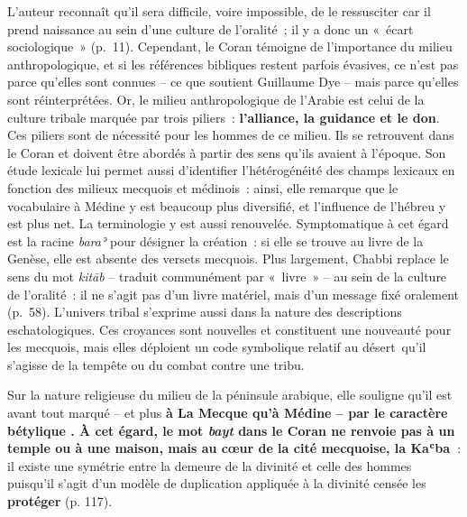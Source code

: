 L'auteur reconnaît qu'il sera difficile, voire impossible, de le
ressusciter car il prend naissance au sein d'une culture de l'oralité~;
il y a donc un «~écart sociologique~» (p.~11). Cependant, le Coran
témoigne de l'importance du milieu anthropologique, et si les références
bibliques restent parfois évasives, ce n'est pas parce qu'elles sont
connues -- ce que soutient Guillaume Dye -- mais parce qu'elles sont
réinterprétées. Or, le milieu anthropologique de l'Arabie est celui de
la culture tribale marquée par trois piliers~: \textbf{l'alliance, la
guidance et le don}. Ces piliers sont de nécessité pour les hommes de ce
milieu. Ils se retrouvent dans le Coran et doivent être abordés à partir
des sens qu'ils avaient à l'époque. Son étude lexicale lui permet aussi
d'identifier l'hétérogénéité des champs lexicaux en fonction des milieux
mecquois et médinois~: ainsi, elle remarque que le vocabulaire à Médine
y est beaucoup plus diversifié, et l'influence de l'hébreu y est plus
net. La terminologie y est aussi renouvelée. Symptomatique à cet égard
est la racine \emph{baraʾ} pour désigner la création~: si elle se trouve
au livre de la Genèse, elle est absente des versets mecquois. Plus
largement, Chabbi replace le sens du mot \emph{kitāb} -- traduit
communément par «~livre~» -- au sein de la culture de l'oralité~: il ne
s'agit pas d'un livre matériel, mais d'un message fixé oralement
(p.~58). L'univers tribal s'exprime aussi dans la nature des
descriptions eschatologiques. Ces croyances sont nouvelles et
constituent une nouveauté pour les mecquois, mais elles déploient un
code symbolique relatif au désert~qu'il s'agisse de la tempête ou du
combat contre une tribu.

Sur la nature religieuse du milieu de la péninsule arabique, elle
souligne qu'il est avant tout marqué -- et plus \textbf{à La Mecque qu'à
Médine -- par le caractère bétylique . À cet égard, le mot
\emph{bayt} dans le Coran ne renvoie pas à un temple ou à une maison,
mais au cœur de la cité mecquoise, la Kaʿba~}: il existe une symétrie
entre la demeure de la divinité et celle des hommes puisqu'il s'agit
d'un modèle de duplication appliquée à la divinité censée les
\textbf{protéger} (p. 117).

